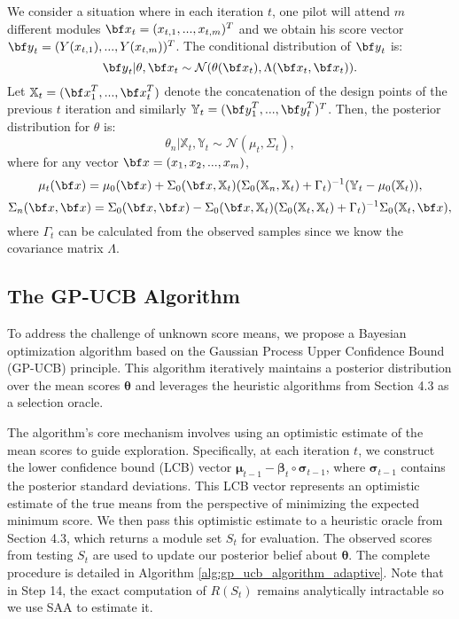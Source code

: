 \documentclass[opre,sglanonrev]{informs4}
\begin{document}
We consider a situation where in each iteration $t$, one pilot will attend $m$ different modules ${\bf x}_t = (x_{t,1},...,x_{t,m})^T$ and we obtain his score vector ${\bf y}_t = (Y(x_{t,1}),...,Y(x_{t,m}))^T$. The conditional distribution of ${\bf y}_t$ is:
$${\bf y}_t | \theta,{\bf x}_t \sim \mathcal{N}(\theta({\bf x}_t), \Lambda({\bf x}_t,{\bf x}_t)). $$ 
Let $\mathbb{X}_t = ({\bf x}_1^T,...,{\bf x}_t^T )$ denote the concatenation of the design points of the previous $t$ iteration and similarly $\mathbb{Y}_t =({\bf y}_1^T,...,{\bf y}_t^T )^T$. Then, the posterior distribution for $\theta$ is:
$$\theta_n|\mathbb{X}_t,\mathbb{Y}_t  \sim \mathcal{N}(\mu_t, \Sigma_t),$$
where for any vector ${\bf x} = (x_1, x_2,...,x_m)$,
$$
	\mu_t({\bf x}) = \mu_0({\bf x}) + \Sigma_0(\bf x, \mathbb{X}_t)(\Sigma_0(\mathbb{X}_n,\mathbb{X}_t) + \Gamma_t)^{-1}(\mathbb{Y}_t-\mu_0(\mathbb{X}_t)),
$$
$$
	\Sigma_n({\bf x},{\bf x}) = \Sigma_0({\bf x},{\bf x}) - \Sigma_0(\bf x, \mathbb{X}_t)(\Sigma_0(\mathbb{X}_t,\mathbb{X}_t) + \Gamma_t)^{-1}\Sigma_0(\mathbb{X}_t, \bf x),
$$
where $\Gamma_t$ can be calculated from the observed samples since we know the covariance matrix $\Lambda$.

\subsection{The GP-UCB Algorithm} 
To address the challenge of unknown score means, we propose a Bayesian optimization algorithm based on the Gaussian Process Upper Confidence Bound (GP-UCB) principle. This algorithm iteratively maintains a posterior distribution over the mean scores $\boldsymbol{\theta}$ and leverages the heuristic algorithms from Section 4.3 as a selection oracle.

The algorithm's core mechanism involves using an optimistic estimate of the mean scores to guide exploration. Specifically, at each iteration $t$, we construct the lower confidence bound (LCB) vector $\boldsymbol{\mu}_{t-1} - \boldsymbol{\beta}_t \circ \boldsymbol{\sigma}_{t-1}$, where $\boldsymbol{\sigma}_{t-1}$ contains the posterior standard deviations. This LCB vector represents an optimistic estimate of the true means from the perspective of minimizing the expected minimum score. We then pass this optimistic estimate to a heuristic oracle from Section 4.3, which returns a module set $S_t$ for evaluation. The observed scores from testing $S_t$ are used to update our posterior belief about $\boldsymbol{\theta}$. The complete procedure is detailed in Algorithm \ref{alg:gp_ucb_algorithm_adaptive}. Note that in Step 14, the exact computation of $R(S_t)$ remains analytically intractable so we use SAA to estimate it.
\end{document}
